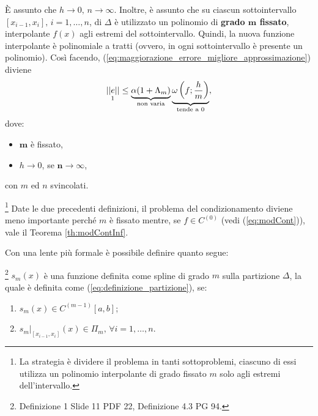 È assunto che $h\rightarrow 0,\, n\rightarrow\infty$. Inoltre, è assunto che su ciascun sottointervallo $[x_{i-1}, x_i],\, i=1,\hdots, n$, di $\Delta$ è utilizzato un polinomio di \textbf{grado $\boldsymbol m$ fissato}, interpolante $f(x)$ agli estremi del sottointervallo. Quindi, la nuova funzione interpolante è polinomiale a tratti (ovvero, in ogni sottointervallo è presente un polinomio).
Così facendo, (\ref{eq:maggiorazione_errore_migliore_approssimazione}) diviene
\begin{equation*}
    \underset{\footnotemark}{||e||}\leq\underbrace{\alpha (1+\Lambda_m)}_{\text{non varia}}\underbrace{\omega\left(f;\frac{h}{m}\right)}_{\text{tende a 0}},
\end{equation*}
dove:
\begin{itemize}
    \item $\boldsymbol{m}$ è fissato,
    \item $h\rightarrow 0$, se $\boldsymbol{n}\rightarrow\infty$,
\end{itemize}
con $m$ ed $n$ svincolati.

\footnote{La strategia è dividere il problema in tanti sottoproblemi, ciascuno di essi utilizza un polinomio interpolante di grado fissato $m$ solo agli estremi dell'intervallo.} Date le due precedenti definizioni, il problema del condizionamento diviene meno importante perché $m$ è fissato mentre, se $f\in C^{(0)}$ (vedi (\ref{eq:modCont})), vale il Teorema \ref{th:modContInf}.

Con una lente più formale è possibile definire quanto segue:
\begin{definition}\label{def:spline}
    \footnote{Definizione 1 Slide 11 PDF 22, Definizione 4.3 PG 94.}
    $s_m(x)$ è una funzione definita come spline di grado $m$ sulla partizione $\Delta$, la quale è definita come (\ref{eq:definizione_partizione}), se:
    \begin{enumerate}
        \item $s_m(x)\in C^{(m-1)}[a,b]$; \footnotemark
        \item $s_m|_{[x_{i-1},x_i]}(x)\in\Pi_m,\,\forall i=1,\hdots,n.$
    \end{enumerate}
\end{definition}

